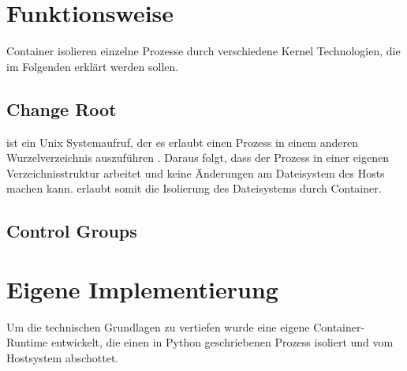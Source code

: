 \section{Funktionsweise}
\label{sec:funktionsweise}

Container isolieren einzelne Prozesse durch verschiedene Kernel Technologien, die im Folgenden erklärt werden sollen.
\subsection{Change Root}
\label{sec:chroot}
\chroot ist ein Unix Systemaufruf, der es erlaubt einen Prozess in einem anderen Wurzelverzeichnis auszuführen \citep{Chroot1LinuxManualPage}. Daraus folgt, dass der Prozess in einer eigenen Verzeichnisstruktur arbeitet und keine Änderungen am Dateisystem des Hosts machen kann. \chroot erlaubt somit die Isolierung des Dateisystems durch Container.

\subsection{Control Groups}
\label{sec:cgroups}


\section{Eigene Implementierung}
\label{sec:eigeneImpl}

Um die technischen Grundlagen zu vertiefen wurde eine eigene Container-Runtime entwickelt, die einen in Python geschriebenen Prozess isoliert und vom Hostsystem abschottet.